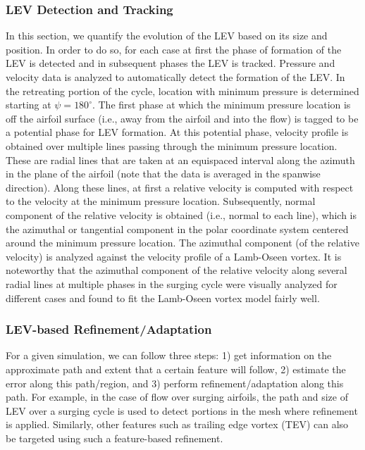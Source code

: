 \subsubsection{LEV Detection and Tracking}


In this section, we quantify the evolution of the LEV based on its size and position.
In order to do so, for each case at first the phase of formation of the LEV is detected and in subsequent phases the LEV is tracked.
Pressure and velocity data is analyzed to automatically detect the formation of the LEV.
In the retreating portion of the cycle, location with minimum pressure is determined starting at $\psi=180^\circ$.
The first phase at which the minimum pressure location is off the airfoil surface (i.e., away from the airfoil and into the flow) is tagged to be a potential phase for LEV formation.
At this potential phase, velocity profile is obtained over multiple lines passing through the minimum pressure location.
These are radial lines that are taken at an equispaced interval along the azimuth in the plane of the airfoil (note that the data is averaged in the spanwise direction).
Along these lines, at first a relative velocity is computed with respect to the velocity at the minimum pressure location.
Subsequently, normal component of the relative velocity is obtained (i.e., normal to each line), which is the azimuthal or tangential component in the polar coordinate system centered around the minimum pressure location.
The azimuthal component (of the relative velocity) is analyzed against the velocity profile of a Lamb-Oseen vortex.
It is noteworthy that the azimuthal component of the relative velocity along several radial lines at multiple phases in the surging cycle were visually analyzed for different cases and found to fit the Lamb-Oseen vortex model fairly well.

\subsubsection{LEV-based Refinement/Adaptation}


For a given simulation, we can follow three steps: 1) get information on the approximate path and extent that a certain feature will follow, 2) estimate the error along this path/region, and 3) perform refinement/adaptation along this path.
For example, in the case of flow over surging airfoils, the path and size of LEV over a surging cycle is used to detect portions in the mesh where refinement is applied.
Similarly, other features such as trailing edge vortex (TEV) can also be targeted using such a feature-based refinement.

